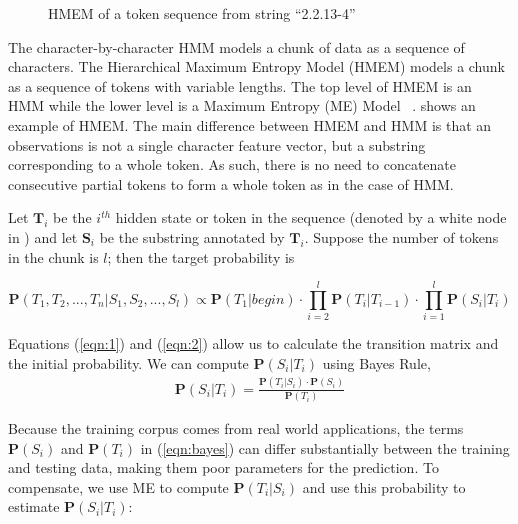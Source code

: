 \begin{figure}[th]
\begin{center}
\end{center}
\caption{HMEM of a token sequence from string ``2.2.13-4''}\label{fig:hmem}
\end{figure}
The character-by-character HMM models a chunk of data as a sequence of
characters. The Hierarchical Maximum Entropy Model (HMEM) models a chunk as
a sequence of tokens with variable lengths.
The top level of HMEM is an HMM while the lower level 
is a Maximum Entropy (ME) Model ~\cite{Berger96:ME,megaweb}.
 shows an example of HMEM.
The main difference between HMEM and HMM is
that an observations is not a single character feature vector, 
but a substring corresponding to a whole token.
As such, there is no need to concatenate consecutive partial tokens
to form a whole token as in the case of HMM.

Let $\mathbf{T}_i$ be the $i^{th}$ hidden state or token in the
sequence (denoted by a white node in ) and
let $\mathbf{S}_i$ be the substring annotated by $\mathbf{T}_i$. 
Suppose the number of tokens in the chunk is $l$; then the
target probability is

\begin{equation}
\mathbf{P}(T_1, T_2, ..., T_n|S_1, S_2, ..., S_l)  \propto
\mathbf{P}(T_1|begin) \cdot \prod_{i=2}^{l}{\mathbf{P}(T_i|T_{i-1})}
\cdot \prod_{i=1}^{l}\mathbf{P}(S_i|T_i)
\end{equation}

Equations (\ref{eqn:1}) and (\ref{eqn:2}) allow us to calculate
the transition matrix and the initial probability.
We can compute $\mathbf{P}(S_i|T_i)$ using Bayes Rule,
\begin{eqnarray} \label{eqn:bayes}
\mathbf{P}(S_i|T_i) = \frac{\mathbf{P}(T_i|S_i) \cdot
\mathbf{P}(S_i)}{\mathbf{P}(T_i)}
\end{eqnarray}

Because the training corpus comes from real world applications, 
the terms $\mathbf{P}(S_i)$ and $\mathbf{P}(T_i)$ in (\ref{eqn:bayes})
can differ substantially between the training and
testing data, making them poor parameters for 
the prediction. To compensate, we use ME 
to compute 
$\mathbf{P}(T_i|S_i)$ and use this probability to estimate
$\mathbf{P}(S_i|T_i)$:

